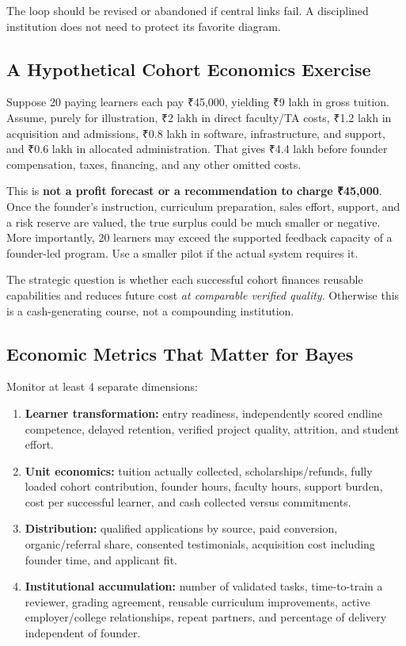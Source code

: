 The loop should be revised or abandoned if central links fail. A disciplined institution does not need to protect its favorite diagram.

\subsection{A Hypothetical Cohort Economics Exercise}
\label{sec:hypothetical_cohort_economics}

Suppose 20 paying learners each pay ₹45,000, yielding ₹9 lakh in gross tuition. Assume, purely for illustration, ₹2 lakh in direct faculty/TA costs, ₹1.2 lakh in acquisition and admissions, ₹0.8 lakh in software, infrastructure, and support, and ₹0.6 lakh in allocated administration. That gives ₹4.4 lakh before founder compensation, taxes, financing, and any other omitted costs.

This is \textbf{not a profit forecast or a recommendation to charge ₹45,000}. Once the founder's instruction, curriculum preparation, sales effort, support, and a risk reserve are valued, the true surplus could be much smaller or negative. More importantly, 20 learners may exceed the supported feedback capacity of a founder-led program. Use a smaller pilot if the actual system requires it.

The strategic question is whether each successful cohort finances reusable capabilities and reduces future cost \textit{at comparable verified quality}. Otherwise this is a cash-generating course, not a compounding institution.

\subsection{Economic Metrics That Matter for Bayes}
\label{sec:economic_metrics_bayes}

Monitor at least 4 separate dimensions:
\begin{enumerate}
    \item \textbf{Learner transformation:} entry readiness, independently scored endline competence, delayed retention, verified project quality, attrition, and student effort.
    \item \textbf{Unit economics:} tuition actually collected, scholarships/refunds, fully loaded cohort contribution, founder hours, faculty hours, support burden, cost per successful learner, and cash collected versus commitments.
    \item \textbf{Distribution:} qualified applications by source, paid conversion, organic/referral share, consented testimonials, acquisition cost including founder time, and applicant fit.
    \item \textbf{Institutional accumulation:} number of validated tasks, time-to-train a reviewer, grading agreement, reusable curriculum improvements, active employer/college relationships, repeat partners, and percentage of delivery independent of founder.
\end{enumerate}

